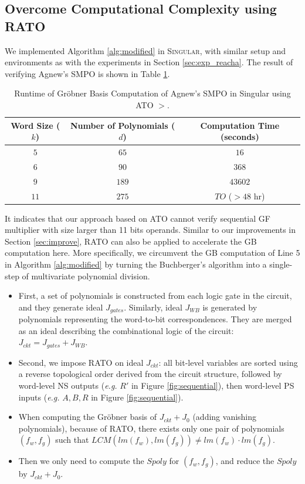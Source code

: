\subsection{Overcome Computational Complexity using RATO}
We implemented Algorithm \ref{alg:modified} in \textsc{Singular}, with similar setup and environments as
with the experiments in Section \ref{sec:exp_reacha}. The result of verifying Agnew's SMPO is shown 
in Table \ref{tab:slimgb}.

\begin{table}[bp]
\begin{center}
	    \caption{Runtime of Gr\"obner Basis Computation of Agnew's SMPO in Singular using ATO $>$.}\label{tab:slimgb}
	    \begin{tabular}{|c|c||c|} 
	        \hline
		Word Size ($k$) & Number of Polynomials ($d$) & Computation Time (seconds)   \\
		\hline
	        $5$	&  $65$  & $16$ \\
	        $6$ &  $90$  & $368$ \\
	        $9$ &  $189$ & $43602$ \\
		$11$	&  $275$  & $TO$ ($>48$ hr)  \\
	        \hline
	    \end{tabular}
	\end{center} 
\end{table}

It indicates that our approach based on ATO cannot verify sequential GF multiplier with size larger than 11 bits operands.
Similar to our improvements in Section \ref{sec:improve}, RATO \cite{TimDAC} can also be applied to 
accelerate the GB computation here. More specifically, we circumvent the GB computation 
of Line 5 in Algorithm \ref{alg:modified} by turning the Buchberger's algorithm 
into a single-step of multivariate polynomial division.

\begin{itemize}
\item First, a set of polynomials is constructed from each logic gate in the circuit, and they generate 
ideal $J_{gates}$. Similarly, ideal $J_{WB}$ is generated by polynomials representing the word-to-bit correspondences.
They are merged as an ideal describing the combinational logic of the circuit: $J_{ckt} = J_{gates} + J_{WB}$.
\item Second, we impose RATO on ideal $J_{ckt}$: all bit-level variables are sorted using a reverse topological order
derived from the circuit structure, followed by word-level NS outputs ({\it e.g.} $R'$ in Figure \ref{fig:sequential}), 
then word-level PS inputs ({\it e.g.} $A,B,R$ in Figure \ref{fig:sequential}).
\item When computing the Gr\"obner basis of $J_{ckt}+J_0$ (adding vanishing polynomials), because of 
RATO, there exists only one pair of polynomials $(f_w,f_g)$ such that $LCM(lm(f_w),lm(f_g)) \neq lm(f_w)\cdot lm(f_g)$.
\item Then we only need to compute the $Spoly$ for $(f_w,f_g)$, and reduce the $Spoly$ by $J_{ckt}+J_0$.
\end{itemize}

